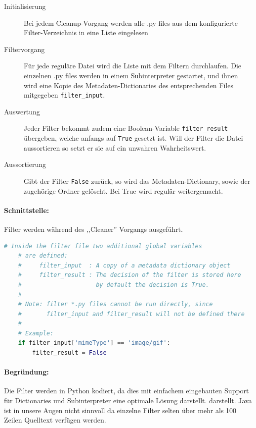 \begin{description}
  \item[Initialisierung] Bei jedem Cleanup-Vorgang werden alle .py files
    aus dem konfigurierte Filter-Verzeichnis in eine Liste eingelesen
  \item[Filtervorgang] Für jede reguläre Datei wird die Liste mit dem
    Filtern durchlaufen. Die einzelnen .py files werden in einem
    Subinterpreter gestartet, und ihnen wird eine Kopie des
    Metadaten-Dictionaries des entsprechenden Files mitgegeben
    \texttt{filter\_input}.
  \item[Auswertung] Jeder Filter bekommt zudem eine Boolean-Variable
    \texttt{filter\_result} übergeben, welche anfangs auf \texttt{True}
    gesetzt ist. Will der Filter die Datei aussortieren so setzt er sie
    auf ein unwahren Wahrheitswert. 
  \item[Aussortierung] Gibt der Filter \texttt{False} zurück, so wird
    das Metadaten-Dictionary, sowie der zugehörige Ordner gelöscht. 
    Bei True wird regulär weitergemacht.
\end{description}

\paragraph{Schnittstelle:}
\label{par:schnittstelle_}
Filter werden während des ,,Cleaner'' Vorgangs ausgeführt.
\begin{lstlisting}[language=python]
    # Inside the filter file two additional global variables
    # are defined:
    #     filter_input  : A copy of a metadata dictionary object
    #     filter_result : The decision of the filter is stored here
    #                     by default the decision is True.
    #
    # Note: filter *.py files cannot be run directly, since 
    #       filter_input and filter_result will not be defined there
    #
    # Example:
    if filter_input['mimeType'] == 'image/gif':
        filter_result = False
\end{lstlisting}

\paragraph{Begründung:}
\label{par:begr_ndung_}
Die Filter werden in Python kodiert, da dies mit einfachem eingebauten Support für
Dictionaries und Subinterpreter eine optimale Lösung darstellt.
darstellt. Java ist in unsere Augen nicht sinnvoll da einzelne Filter
selten über mehr als 100 Zeilen Quelltext verfügen werden.


